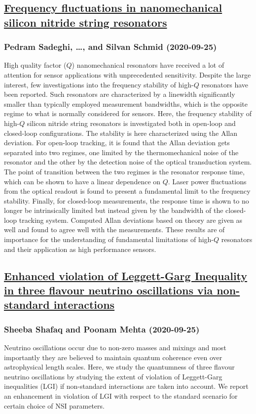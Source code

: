 \subsection*{\href{http://arxiv.org/abs/2009.12331v1}{Frequency fluctuations in nanomechanical silicon nitride string  resonators}}
\subsubsection*{Pedram Sadeghi, \dots, and Silvan Schmid (2020-09-25)}
High quality factor ($Q$) nanomechanical resonators have received a lot of
attention for sensor applications with unprecedented sensitivity. Despite the
large interest, few investigations into the frequency stability of high-$Q$
resonators have been reported. Such resonators are characterized by a linewidth
significantly smaller than typically employed measurement bandwidths, which is
the opposite regime to what is normally considered for sensors. Here, the
frequency stability of high-$Q$ silicon nitride string resonators is
investigated both in open-loop and closed-loop configurations. The stability is
here characterized using the Allan deviation. For open-loop tracking, it is
found that the Allan deviation gets separated into two regimes, one limited by
the thermomechanical noise of the resonator and the other by the detection
noise of the optical transduction system. The point of transition between the
two regimes is the resonator response time, which can be shown to have a linear
dependence on $Q$. Laser power fluctuations from the optical readout is found
to present a fundamental limit to the frequency stability. Finally, for
closed-loop measurements, the response time is shown to no longer be
intrinsically limited but instead given by the bandwidth of the closed-loop
tracking system. Computed Allan deviations based on theory are given as well
and found to agree well with the measurements. These results are of importance
for the understanding of fundamental limitations of high-$Q$ resonators and
their application as high performance sensors.

\subsection*{\href{http://arxiv.org/abs/2009.12328v1}{Enhanced violation of Leggett-Garg Inequality in three flavour neutrino  oscillations via non-standard interactions}}
\subsubsection*{Sheeba Shafaq and Poonam Mehta (2020-09-25)}
Neutrino oscillations occur due to non-zero masses and mixings and most
importantly they are believed to maintain quantum coherence even over
astrophysical length scales. Here, we study the quantumness of three flavour
neutrino oscillations by studying the extent of violation of Leggett-Garg
inequalities (LGI) if non-standard interactions are taken into account. We
report an enhancement in violation of LGI with respect to the standard scenario
for certain choice of NSI parameters.

